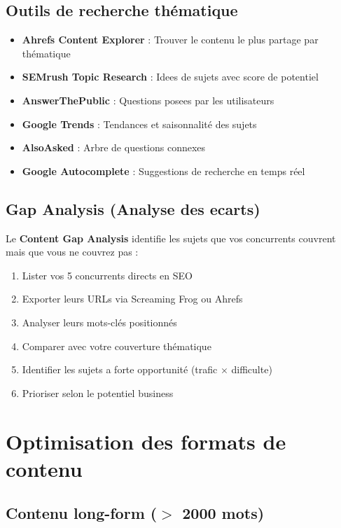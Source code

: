 \documentclass[12pt,a4paper,twoside]{report}
\newcommand{\keyword}[1]{\textbf{\textcolor{googleblue}{#1}}}
\begin{document}
\subsection{Outils de recherche thématique}

\begin{itemize}
    \item \textbf{Ahrefs Content Explorer} : Trouver le contenu le plus partage par thématique
    \item \textbf{SEMrush Topic Research} : Idees de sujets avec score de potentiel
    \item \textbf{AnswerThePublic} : Questions posees par les utilisateurs
    \item \textbf{Google Trends} : Tendances et saisonnalité des sujets
    \item \textbf{AlsoAsked} : Arbre de questions connexes
    \item \textbf{Google Autocomplete} : Suggestions de recherche en temps réel
\end{itemize}

\subsection{Gap Analysis (Analyse des ecarts)}

Le \keyword{Content Gap Analysis} identifie les sujets que vos concurrents couvrent mais que vous ne couvrez pas :

\begin{enumerate}
    \item Lister vos 5 concurrents directs en SEO
    \item Exporter leurs URLs via Screaming Frog ou Ahrefs
    \item Analyser leurs mots-clés positionnés
    \item Comparer avec votre couverture thématique
    \item Identifier les sujets a forte opportunité (trafic $\times$ difficulte)
    \item Prioriser selon le potentiel business
\end{enumerate}

\section{Optimisation des formats de contenu}

\subsection{Contenu long-form ($>$ 2000 mots)}
\end{document}
